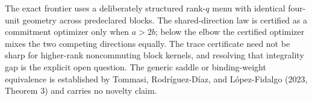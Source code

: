 The exact frontier uses a deliberately structured rank-\(q\) menu with identical four-unit geometry across predeclared blocks. The shared-direction law is certified as a commitment optimizer only when \(a>2b\); below the elbow the certified optimizer mixes the two competing directions equally. The trace certificate need not be sharp for higher-rank noncommuting block kernels, and resolving that integrality gap is the explicit open question. The generic saddle or binding-weight equivalence is established by Tommasi, Rodr\'iguez-D\'iaz, and L\'opez-Fidalgo (2023, Theorem 3) and carries no novelty claim.
